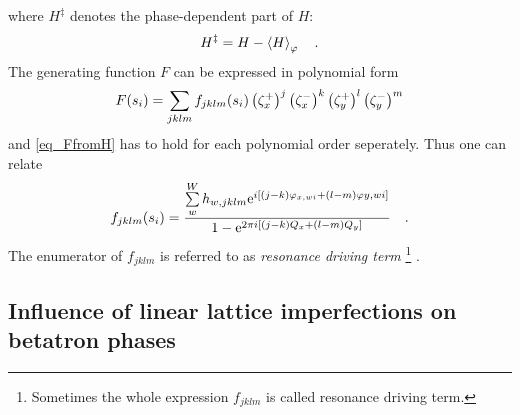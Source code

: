 %
where $H^{\ddagger}$ denotes the phase-dependent part of $H$:
%
\begin{equation}
    H^\ddagger = H - \left\langle H \right\rangle_{\varphi}
    \quad .
\end{equation}
%
The generating function $F$ can be expressed in polynomial form
%
\begin{equation}
    F(s_i) = \sum\limits_{jklm} f_{jklm}(s_i) \left(\zeta_x^+\right)^{j} \left(\zeta_x^-\right)^{k} \left(\zeta_y^+\right)^{l} \left(\zeta_y^-\right)^{m}
\end{equation}
%
and \eqref{eq_FfromH} has to hold for each polynomial order seperately. Thus one can relate 
%
\begin{equation}
    f_{jklm}(s_i)=\frac{
        \sum\limits_w^W h_{w,jklm} \text{e}^{i \left[ (j-k) \varphi_{x,wi} + (l-m)\varphi{y,wi} \right]}
    }{
        1-\text{e}^{2\pi i [(j-k)Q_x+(l-m)Q_y]}
    }
    \quad .
    \label{eq_fijkl_from_h}
\end{equation}
%
The enumerator of $f_{jklm}$ is referred to as \emph{resonance driving term}%
\footnote{%
  Sometimes the whole expression $f_{jklm}$ is called resonance driving term.
}%
.

\subsection{Influence of linear lattice imperfections on betatron phases}
\label{sec:deriv}
\label{sec_phase_beating}

